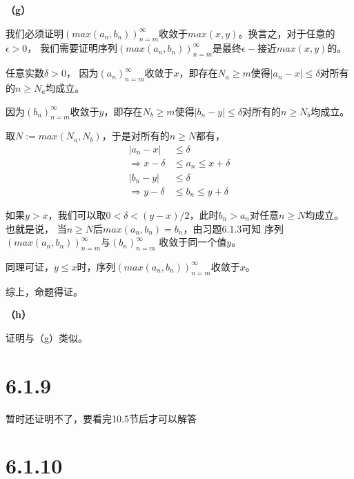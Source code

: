 \documentclass{article}
\theoremstyle{mystyle}
\begin{document}
\textbf{（g）}

我们必须证明$(max(a_n,b_n))_{n=m}^\infty$收敛于$max(x,y)$。换言之，对于任意的$\epsilon > 0$，
我们需要证明序列$(max(a_n,b_n))_{n=m}^\infty$是最终$\epsilon -$接近$max(x,y)$的。

任意实数$\delta > 0$，
因为$(a_n)_{n=m}^\infty$收敛于$x$，即存在$N_a \geq m$使得$|a_n - x| \leq \delta$对所有的$n \geq N_a$均成立。

因为$(b_n)_{n=m}^\infty$收敛于$y$，即存在$N_b \geq m$使得$|b_n - y| \leq \delta$对所有的$n \geq N_b$均成立。

取$N := max(N_a, N_b)$，于是对所有的$n \geq N$都有，
\begin{align*}
  |a_n - x|              & \leq \delta              \\
  \Rightarrow x - \delta & \leq a_n \leq x + \delta \\
  |b_n - y|              & \leq \delta              \\
  \Rightarrow y - \delta & \leq b_n \leq y + \delta
\end{align*}

如果$y > x$，我们可以取$0 < \delta < (y-x)/2$，此时$b_n > a_n$对任意$n \geq N$均成立。也就是说，
当$n \geq N$后$max(a_n,b_n) = b_n$，由习题6.1.3可知 序列$(max(a_n,b_n))_{n=m}^\infty$与$(b_n)_{n=m}^\infty$
收敛于同一个值$y$。

同理可证，$y \leq x$时，序列$(max(a_n,b_n))_{n=m}^\infty$收敛于$x$。

综上，命题得证。

\textbf{（h）}

证明与（g）类似。


\section*{6.1.9}

暂时还证明不了，要看完10.5节后才可以解答

\section*{6.1.10}
\end{document}
